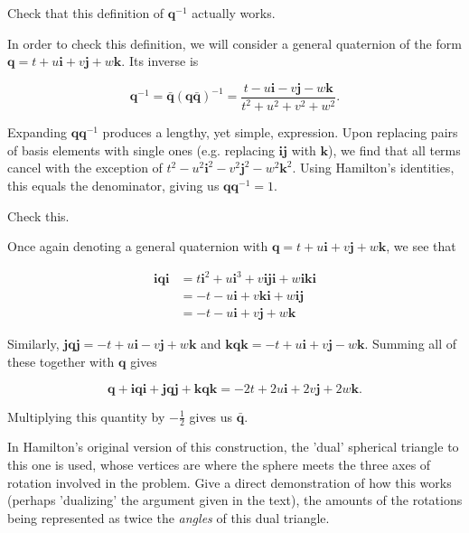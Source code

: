 \documentclass[../the-road-to-reality.tex]{subfiles}
\begin{document}
\begin{questions}
\question Check that this definition of $\mathbf{q}^{-1}$ actually works.

\begin{solution}
        In order to check this definition, we will consider a general quaternion of the form $\mathbf{q} = t + u\mathbf{i} + v\mathbf{j} + w\mathbf{k}$. Its inverse is

	\[
        \mathbf{q}^{-1} = \bar{\mathbf{q}}(\mathbf{q}\bar{\mathbf{q}})^{-1} = \frac{t-u\mathbf{i}-v\mathbf{j}-w\mathbf{k}}{t^2+u^2+v^2+w^2}
	.\] 

        Expanding $\mathbf{q}\mathbf{q}^{-1}$ produces a lengthy, yet simple, expression. Upon replacing pairs of basis elements with single ones (e.g. replacing $\mathbf{ij}$ with $\mathbf{k}$), we find that all terms cancel with the exception of $t^2 - u^2\mathbf{i}^2 - v^2\mathbf{j}^2 - w^2\mathbf{k}^2$. Using Hamilton's identities, this equals the denominator, giving us $\mathbf{q}\mathbf{q}^{-1} = 1$.
\end{solution}

\question Check this.

\begin{solution}
        Once again denoting a general quaternion with $\mathbf{q} = t + u\mathbf{i} + v\mathbf{j} + w\mathbf{k}$, we see that

        \begin{align*}
                \mathbf{i}\mathbf{q}\mathbf{i} &= t\mathbf{i}^2 + u\mathbf{i}^3 + v\mathbf{i}\mathbf{j}\mathbf{i} + w\mathbf{i}\mathbf{k}\mathbf{i} \\
                &= -t - u\mathbf{i} + v\mathbf{k}\mathbf{i} + w\mathbf{i}\mathbf{j} \\
                &= -t - u\mathbf{i} + v\mathbf{j} + w\mathbf{k}
        \end{align*}

        Similarly, $\mathbf{jqj} = -t + u\mathbf{i} - v\mathbf{j} + w\mathbf{k}$ and $\mathbf{kqk} = -t + u\mathbf{i} + v\mathbf{j} - w\mathbf{k}$. Summing all of these together with $\mathbf{q}$ gives

	\[
        \mathbf{q} + \mathbf{iqi} + \mathbf{jqj} + \mathbf{kqk} = -2t + 2u\mathbf{i} + 2v\mathbf{j} + 2w\mathbf{k}
	.\] 

        Multiplying this quantity by $-\frac{1}{2}$ gives us $\bar{\mathbf{q}}$.
\end{solution}	

\question In Hamilton's original version of this construction, the 'dual' spherical triangle to this one is used, whose vertices are where the sphere meets the three axes of rotation involved in the problem. Give a direct demonstration of how this works (perhaps 'dualizing' the argument given in the text), the amounts of the rotations being represented as twice the \textit{angles} of this dual triangle.


\end{questions}
\end{document}
